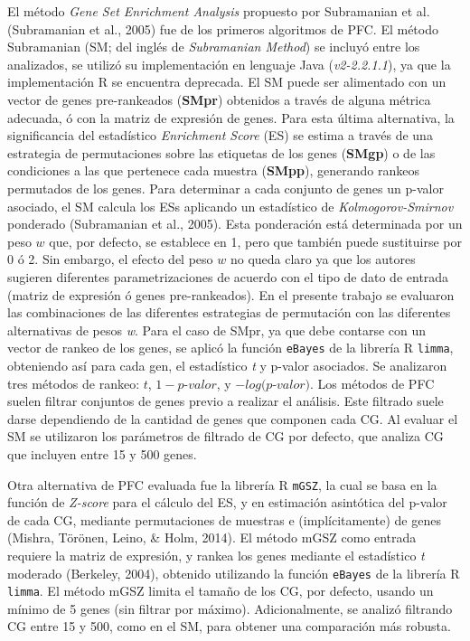 \documentclass[12pt,twoside]{reedthesis}
\begin{document}
El método \emph{Gene Set Enrichment Analysis} propuesto por Subramanian et al. (Subramanian et al., 2005) fue de los primeros algoritmos de PFC. El método Subramanian (SM; del inglés de \emph{Subramanian Method}) se incluyó entre los analizados, se utilizó su implementación en lenguaje Java (\emph{v2-2.2.1.1}), ya que la implementación R se encuentra deprecada. El SM puede ser alimentado con un vector de genes pre-rankeados (\textbf{SMpr}) obtenidos a través de alguna métrica adecuada, ó con la matriz de expresión de genes. Para esta última alternativa, la significancia del estadístico \emph{Enrichment Score} (ES) se estima a través de una estrategia de permutaciones sobre las etiquetas de los genes (\textbf{SMgp}) o de las condiciones a las que pertenece cada muestra (\textbf{SMpp}), generando rankeos permutados de los genes. Para determinar a cada conjunto de genes un p-valor asociado, el SM calcula los ESs aplicando un estadístico de \emph{Kolmogorov-Smirnov} ponderado (Subramanian et al., 2005). Esta ponderación está determinada por un peso \(w\) que, por defecto, se establece en 1, pero que también puede sustituirse por 0 ó 2. Sin embargo, el efecto del peso \(w\) no queda claro ya que los autores sugieren diferentes parametrizaciones de acuerdo con el tipo de dato de entrada (matriz de expresión ó genes pre-rankeados). En el presente trabajo se evaluaron las combinaciones de las diferentes estrategias de permutación con las diferentes alternativas de pesos \emph{w}. Para el caso de SMpr, ya que debe contarse con un vector de rankeo de los genes, se aplicó la función \texttt{eBayes} de la librería R \texttt{limma}, obteniendo así para cada gen, el estadístico \emph{t} y p-valor asociados. Se analizaron tres métodos de rankeo: \(t\), \(1-p\)-\(valor\), y \(-log(p\)-\(valor)\). Los métodos de PFC suelen filtrar conjuntos de genes previo a realizar el análisis. Este filtrado suele darse dependiendo de la cantidad de genes que componen cada CG. Al evaluar el SM se utilizaron los parámetros de filtrado de CG por defecto, que analiza CG que incluyen entre 15 y 500 genes.

\par

Otra alternativa de PFC evaluada fue la librería R \texttt{mGSZ}, la cual se basa en la función de \emph{Z-score} para el cálculo del ES, y en estimación asintótica del p-valor de cada CG, mediante permutaciones de muestras e (implícitamente) de genes (Mishra, Törönen, Leino, \& Holm, 2014). El método mGSZ como entrada requiere la matriz de expresión, y rankea los genes mediante el estadístico \emph{t} moderado (Berkeley, 2004), obtenido utilizando la función \texttt{eBayes} de la librería R \texttt{limma}. El método mGSZ limita el tamaño de los CG, por defecto, usando un mínimo de 5 genes (sin filtrar por máximo). Adicionalmente, se analizó filtrando CG entre 15 y 500, como en el SM, para obtener una comparación más robusta.
\end{document}
